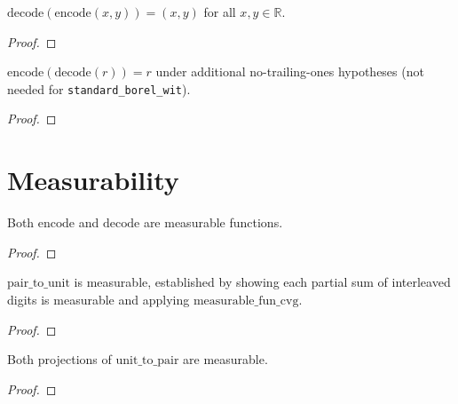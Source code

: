 \begin{theorem}\label{thm:encode_RRK}
  \rocqok
  $\mathrm{decode}(\mathrm{encode}(x, y)) = (x, y)$ for all
  $x, y \in \mathbb{R}$.
\end{theorem}
\begin{proof}\rocqok\end{proof}

\begin{theorem}\label{thm:decode_RRK}
  \rocqok
  $\mathrm{encode}(\mathrm{decode}(r)) = r$ under additional
  no-trailing-ones hypotheses (not needed for \texttt{standard\_borel\_wit}).
\end{theorem}
\begin{proof}\rocqok\end{proof}


\section{Measurability}\label{sec:measurability}

\begin{lemma}\label{lem:measurable_encode_decode}
  \rocqok
  Both $\mathrm{encode}$ and $\mathrm{decode}$ are measurable functions.
\end{lemma}
\begin{proof}\rocqok\end{proof}

\begin{lemma}\label{lem:measurable_pair_to_unit}
  \rocqok
  $\mathrm{pair\_to\_unit}$ is measurable, established by showing each
  partial sum of interleaved digits is measurable and applying
  $\mathrm{measurable\_fun\_cvg}$.
\end{lemma}
\begin{proof}\rocqok\end{proof}

\begin{lemma}\label{lem:measurable_unit_to_pair}
  \rocqok
  Both projections of $\mathrm{unit\_to\_pair}$ are measurable.
\end{lemma}
\begin{proof}\rocqok\end{proof}


